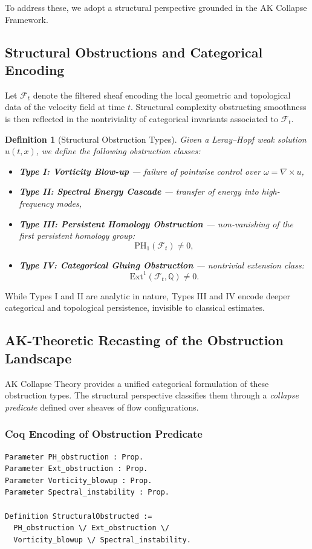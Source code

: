 \documentclass[11pt]{article}
\newtheorem{definition}[theorem]{Definition}
\begin{document}
To address these, we adopt a structural perspective grounded in the AK Collapse Framework.

\subsection{Structural Obstructions and Categorical Encoding}

Let \( \mathcal{F}_t \) denote the filtered sheaf encoding the local geometric and topological data of the velocity field at time \( t \). Structural complexity obstructing smoothness is then reflected in the nontriviality of categorical invariants associated to \( \mathcal{F}_t \).

\begin{definition}[Structural Obstruction Types]
Given a Leray--Hopf weak solution \( u(t,x) \), we define the following obstruction classes:
\begin{itemize}
  \item \textbf{Type I: Vorticity Blow-up} — failure of pointwise control over \( \omega = \nabla \times u \),
  \item \textbf{Type II: Spectral Energy Cascade} — transfer of energy into high-frequency modes,
  \item \textbf{Type III: Persistent Homology Obstruction} — non-vanishing of the first persistent homology group:
  \[
  \mathrm{PH}_1(\mathcal{F}_t) \neq 0,
  \]
  \item \textbf{Type IV: Categorical Gluing Obstruction} — nontrivial extension class:
  \[
  \mathrm{Ext}^1(\mathcal{F}_t, \mathbb{Q}) \neq 0.
  \]
\end{itemize}
\end{definition}

While Types I and II are analytic in nature, Types III and IV encode deeper categorical and topological persistence, invisible to classical estimates.

\subsection{AK-Theoretic Recasting of the Obstruction Landscape}

AK Collapse Theory provides a unified categorical formulation of these obstruction types. The structural perspective classifies them through a \emph{collapse predicate} defined over sheaves of flow configurations.

\subsubsection*{Coq Encoding of Obstruction Predicate}
\begin{lstlisting}
Parameter PH_obstruction : Prop.
Parameter Ext_obstruction : Prop.
Parameter Vorticity_blowup : Prop.
Parameter Spectral_instability : Prop.

Definition StructuralObstructed :=
  PH_obstruction \/ Ext_obstruction \/
  Vorticity_blowup \/ Spectral_instability.
\end{lstlisting}
\end{document}
